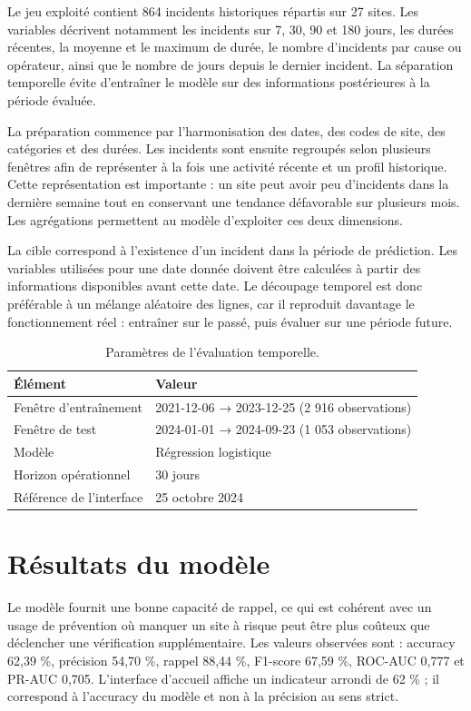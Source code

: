 \documentclass[12pt,a4paper,oneside]{report}
\begin{document}
Le jeu exploité contient 864 incidents historiques répartis sur 27 sites. Les variables décrivent notamment les incidents sur 7, 30, 90 et 180 jours, les durées récentes, la moyenne et le maximum de durée, le nombre d’incidents par cause ou opérateur, ainsi que le nombre de jours depuis le dernier incident. La séparation temporelle évite d’entraîner le modèle sur des informations postérieures à la période évaluée.

La préparation commence par l’harmonisation des dates, des codes de site, des catégories et des durées. Les incidents sont ensuite regroupés selon plusieurs fenêtres afin de représenter à la fois une activité récente et un profil historique. Cette représentation est importante : un site peut avoir peu d’incidents dans la dernière semaine tout en conservant une tendance défavorable sur plusieurs mois. Les agrégations permettent au modèle d’exploiter ces deux dimensions.

La cible correspond à l’existence d’un incident dans la période de prédiction. Les variables utilisées pour une date donnée doivent être calculées à partir des informations disponibles avant cette date. Le découpage temporel est donc préférable à un mélange aléatoire des lignes, car il reproduit davantage le fonctionnement réel : entraîner sur le passé, puis évaluer sur une période future.

\begin{table}[H]
\centering
\small
\caption{Paramètres de l’évaluation temporelle.}
\begin{tabularx}{\textwidth}{B{4.0cm} X}
\toprule
Élément & Valeur\\
\midrule
Fenêtre d’entraînement & 2021-12-06 → 2023-12-25 (2 916 observations)\\
Fenêtre de test & 2024-01-01 → 2024-09-23 (1 053 observations)\\
Modèle & Régression logistique\\
Horizon opérationnel & 30 jours\\
Référence de l’interface & 25 octobre 2024\\
\bottomrule
\end{tabularx}
\end{table}

\section{Résultats du modèle}

Le modèle fournit une bonne capacité de rappel, ce qui est cohérent avec un usage de prévention où manquer un site à risque peut être plus coûteux que déclencher une vérification supplémentaire. Les valeurs observées sont : accuracy 62,39 \%, précision 54,70 \%, rappel 88,44 \%, F1-score 67,59 \%, ROC-AUC 0,777 et PR-AUC 0,705. L’interface d’accueil affiche un indicateur arrondi de 62 \% ; il correspond à l’accuracy du modèle et non à la précision au sens strict.
\end{document}
